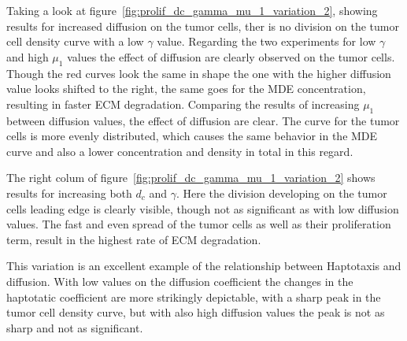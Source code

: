 Taking a look at figure~\ref{fig:prolif_dc_gamma_mu_1_variation_2}, showing results for increased diffusion on the tumor cells, ther is no division on the tumor cell density curve with a low $\gamma$ value. Regarding the two experiments for low $\gamma$ and high $\mu_1$ values the effect of diffusion are clearly observed on the tumor cells. Though the red curves look the same in shape the one with the higher diffusion value looks shifted to the right, the same goes for the MDE concentration, resulting in faster ECM degradation. Comparing the results of increasing $\mu_1$ between diffusion values, the effect of diffusion are clear. The curve for the tumor cells is more evenly distributed, which causes the same behavior in the MDE curve and also a lower concentration and density in total in this regard.

The right colum of figure~\ref{fig:prolif_dc_gamma_mu_1_variation_2} shows results for increasing both $d_c$ and $\gamma$. Here the division developing on the tumor cells leading edge is clearly visible, though not as significant as with low diffusion values. The fast and even spread of the tumor cells as well as their proliferation term, result in the highest rate of ECM degradation. 

This variation is an excellent example of the relationship between Haptotaxis and diffusion. With low values on the diffusion coefficient the changes in the haptotatic coefficient are more strikingly depictable, with a sharp peak in the tumor cell density curve, but with also high diffusion values the peak is not as sharp and not as significant. 

